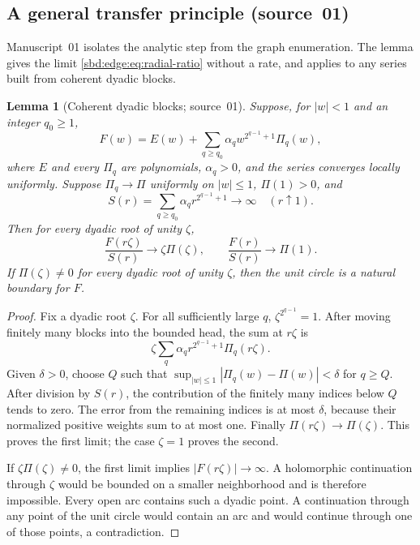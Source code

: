 \documentclass[11pt,a4paper]{article}
\newtheorem{lemma}[theorem]{Lemma}
\theoremstyle{definition}
\begin{document}
\subsection{A general transfer principle (source~01)}
\label{sbd:edge:sec:transfer}
Manuscript~01 isolates the analytic step from the graph enumeration. The
lemma gives the limit \eqref{sbd:edge:eq:radial-ratio} without a rate, and
applies to any series built from coherent dyadic blocks.

\begin{lemma}[Coherent dyadic blocks; source~01]
\label{sbd:edge:lem:transfer}
Suppose, for $|w|<1$ and an integer $q_0\ge1$,
\[
 F(w)=E(w)+\sum_{q\ge q_0}\alpha_qw^{2^{q-1}+1}\Pi_q(w),
\]
where $E$ and every $\Pi_q$ are polynomials, $\alpha_q>0$, and the series
converges locally uniformly. Suppose $\Pi_q\to\Pi$ uniformly on $|w|\le1$,
$\Pi(1)>0$, and
\[
 S(r)=\sum_{q\ge q_0}\alpha_qr^{2^{q-1}+1}\longrightarrow\infty
 \quad(r\uparrow1).
\]
Then for every dyadic root of unity $\zeta$,
\begin{equation}\label{sbd:edge:eq:transfer}
 \frac{F(r\zeta)}{S(r)}\longrightarrow\zeta\Pi(\zeta),
 \qquad
 \frac{F(r)}{S(r)}\longrightarrow\Pi(1).
\end{equation}
If $\Pi(\zeta)\ne0$ for every dyadic root of unity $\zeta$, then the unit
circle is a natural boundary for $F$.
\end{lemma}
\begin{proof}
Fix a dyadic root $\zeta$. For all sufficiently large $q$,
$\zeta^{2^{q-1}}=1$. After moving finitely many blocks into the bounded
head, the sum at $r\zeta$ is
\[
 \zeta\sum_q\alpha_qr^{2^{q-1}+1}\Pi_q(r\zeta).
\]
Given $\delta>0$, choose $Q$ such that
$\sup_{|w|\le1}|\Pi_q(w)-\Pi(w)|<\delta$ for $q\ge Q$. After division by
$S(r)$, the contribution of the finitely many indices below $Q$ tends to
zero. The error from the remaining indices is at most $\delta$, because
their normalized positive weights sum to at most one. Finally
$\Pi(r\zeta)\to\Pi(\zeta)$. This proves the first limit; the case $\zeta=1$
proves the second.

If $\zeta\Pi(\zeta)\ne0$, the first limit implies $|F(r\zeta)|\to\infty$. A
holomorphic continuation through $\zeta$ would be bounded on a smaller
neighborhood and is therefore impossible. Every open arc contains such a
dyadic point. A continuation through any point of the unit circle would
contain an arc and would continue through one of those points, a
contradiction.
\end{proof}
\end{document}
